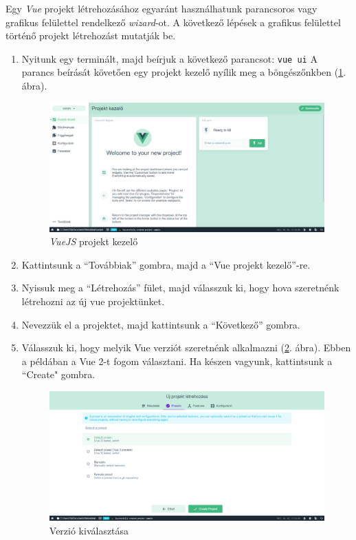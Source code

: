 Egy \textit{Vue} projekt létrehozásához egyaránt használhatunk parancsoros vagy grafikus felülettel rendelkező \textit{wizard}-ot. A következő lépések a grafikus felülettel történő projekt létrehozást mutatják be.
\begin{enumerate}
  \item Nyitunk egy terminált, majd beírjuk a következő parancsot: \texttt{vue ui}
  A parancs beírását követően egy projekt kezelő nyílik meg a böngészőnkben (\ref{fig:vueui}. ábra).
  
  \begin{figure}[h!]
  	\centering
  	\includegraphics[width=\textwidth]{images/1617369552704.png}
  	\caption{\textit{VueJS} projekt kezelő}
  	\label{fig:vueui}
  \end{figure}

  \item Kattintsunk a “Továbbiak” gombra, majd a “Vue projekt kezelő”-re.
  \item Nyissuk meg a “Létrehozás” fület, majd válasszuk ki, hogy hova szeretnénk létrehozni az új vue projektünket.

  \item Nevezzük el a projektet, majd kattintsunk a “Következő” gombra.

  \item Válasszuk ki, hogy melyik Vue verziót szeretnénk alkalmazni (\ref{fig:vueversion}. ábra). Ebben a példában a Vue 2-t fogom választani. Ha készen vagyunk, kattintsunk a “Create" gombra.
  
\begin{figure}[h!]
\centering
\includegraphics[width=\textwidth]{images/1617369965789.png}
\caption{Verzió kiválasztása}
\label{fig:vueversion}
\end{figure}


\end{enumerate}
